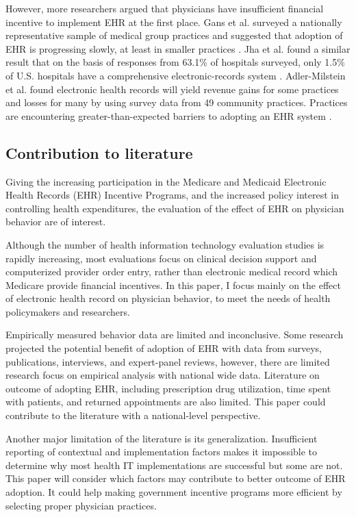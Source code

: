 However, more researchers argued that physicians have insufficient financial incentive to implement EHR at the first place. Gans et al. surveyed a nationally representative sample of medical group practices and suggested that adoption of EHR is progressing slowly, at least in smaller practices \citep{Gans2005}. Jha et al. found a similar result that on the basis of responses from 63.1\% of hospitals surveyed, only 1.5\% of U.S. hospitals have a comprehensive electronic-records system \citep{Jha2009}. Adler-Milstein et al. found electronic health records will yield revenue gains for some practices and losses for many by using survey data from 49 community practices. Practices are encountering greater-than-expected barriers to adopting an EHR system \citep{Adler-Milstein2012}.

\subsection{Contribution to literature}

Giving the increasing participation in the Medicare and Medicaid Electronic Health Records (EHR) Incentive Programs, and the increased policy interest in controlling health expenditures, the evaluation of the effect of EHR on physician behavior are of interest.

Although the number of health information technology evaluation studies is rapidly increasing, most evaluations focus on clinical decision support and computerized provider order entry, rather than electronic medical record which Medicare provide financial incentives. In this paper, I focus mainly on the effect of electronic health record on physician behavior, to meet the needs of health policymakers and researchers.

Empirically measured behavior data are limited and inconclusive. Some research projected the potential benefit of adoption of EHR with data from surveys, publications, interviews, and expert-panel reviews, however, there are limited research focus on empirical analysis with national wide data. Literature on outcome of adopting EHR, including prescription drug utilization, time spent with patients, and returned appointments are also limited. This paper could contribute to the literature with a national-level perspective.

Another major limitation of the literature is its generalization. Insufficient reporting of contextual and implementation factors makes it impossible to determine why most health IT implementations are successful but some are not. This paper will consider which factors may contribute to better outcome of EHR adoption. It could help making government incentive programs more efficient by selecting proper physician practices.

